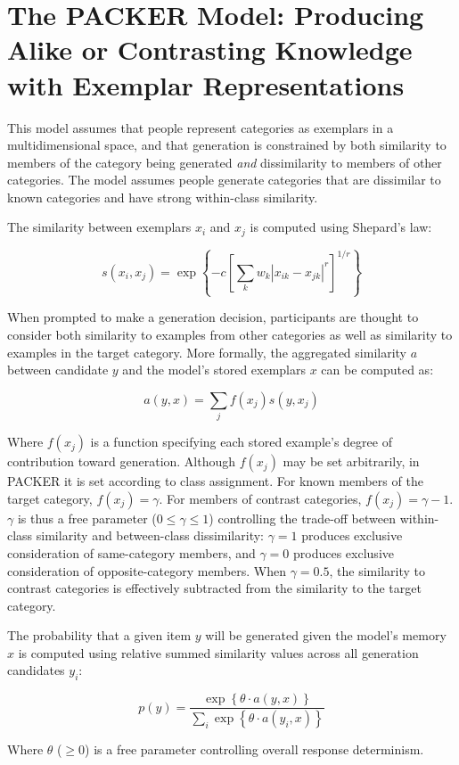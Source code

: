 \documentclass[12pt]{article} \usepackage[letterpaper, margin=1in,
\begin{document}
\section{The PACKER Model: Producing Alike or Contrasting Knowledge with
Exemplar Representations}


This model assumes that people represent categories as exemplars in a
multidimensional space, and that generation is constrained by both similarity to
members of the category being generated \textit{and} dissimilarity to members of
other categories. The model assumes people generate categories that are
dissimilar to known categories and have strong within-class similarity.

The similarity between exemplars $x_i$ and $x_j$ is computed using Shepard's
law:

\begin{equation} s\left(x_i,x_j\right) = \exp \left\{ -c \left[\sum_{k}{ w_k
\left| x_{ik} - x_{jk} \right|^r }\right]^{1/r} \right\}
\label{eq:similarity}
\end{equation}

When prompted to make a generation decision, participants are thought to
consider both similarity to examples from other categories as well as similarity
to examples in the target category. More formally, the aggregated similarity $a$
between candidate $y$ and the model's stored exemplars $x$ can be computed as:

\begin{equation} a(y, x) = \sum_j{f(x_j) s(y, x_j)}
\end{equation}

Where $f(x_j)$ is a function specifying each stored example's degree of
contribution toward generation. Although $f(x_j)$ may be set arbitrarily, in
PACKER it is set according to class assignment. For known members of the target
category, $f(x_j) = \gamma$. For members of contrast categories, $f(x_j) =
\gamma - 1$. $\gamma$ is thus a free parameter ($0 \leq \gamma \leq 1$)
controlling the trade-off between within-class similarity and between-class
dissimilarity: $\gamma = 1$ produces exclusive consideration of same-category
members, and $\gamma = 0$ produces exclusive consideration of opposite-category
members. When $\gamma = 0.5$, the similarity to contrast categories is
effectively subtracted from the similarity to the target category.

The probability that a given item $y$ will be generated given the model's memory
$x$ is computed using relative summed similarity values across all generation
candidates $y_i$:

\begin{equation} p(y) = \dfrac { \exp \left \{ \theta \cdot a \left( y, x
\right) \right \} } { \sum_i{ \exp \left \{ \theta \cdot a \left( y_i, x \right)
\right\} } }
\label{eq:packer-choice}
\end{equation}

Where $\theta$ ($\geq 0$) is a free parameter controlling overall response
determinism.
\end{document}
